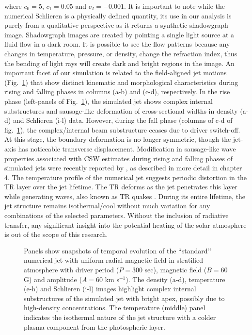 where $c_0=5$, $c_1=0.05$ and $c_2=-0.001$. It is important to note while the numerical Schlieren is a physically defined quantity, its use in our analysis is purely from a qualitative perspective as it returns a synthetic shadowgraph image. Shadowgraph images are created by pointing a single light source at a fluid flow in a dark room. It is possible to see the flow patterns because any changes in temperature, pressure, or density, change the refraction index, thus the bending of light rays will create dark and bright regions in the image. An important facet of our simulation is related to the field-aligned jet motions (Fig.~\ref{standard_jet}) that show distinct kinematic and morphological characteristics during rising and falling phases in columns (a-b) and (c-d), respectively. In the rise phase (left-panels of Fig.~\ref{standard_jet}), the simulated jet shows complex internal substructures and sausage-like deformation of cross-sectional widths in density (a-d) and Schlieren (i-l) data. However, during the fall phase (columns of c-d of fig.~\ref{standard_jet}), the complex/internal beam substructure ceases due to driver switch-off. At this stage, the boundary deformation is no longer symmetric, though the jet-axis has noticeable transverse displacement. Modification in sausage-like wave properties associated with CSW estimates during rising and falling phases of simulated jets were recently reported by \cite{Dover2020ApJ90572D}, as described in more detail in chapter 4. The temperature profile of the numerical jet suggests periodic distortion in the TR layer over the jet lifetime. The TR deforms as the jet penetrates this layer while generating waves, also known as TR quakes \citep{Scullion2011}. During its entire lifetime, the jet structure remains isothermal/cool without much variation for any combinations of the selected parameters. Without the inclusion of radiative transfer, any significant insight into the potential heating of the solar atmosphere is out of the scope of this research. \np
\begin{figure}
\captionsetup[subfigure]{labelformat=empty}
\centering
{}
\caption{Panels show snapshots of temporal evolution of the ``standard’’ numerical jet with uniform radial magnetic field in stratified atmosphere with driver period ($P = 300$ sec), magnetic field ($B = 60$ G) and amplitude ($A = 60$ km s$^{-1}$). The density (a-d), temperature (e-h) and Schlieren (i-l) images highlight complex internal substructures of the simulated jet with bright apex, possibly due to high-density concentrations. The temperature (middle) panel indicates the isothermal nature of the jet structure with a colder plasma component from the photospheric layer.}
\label{standard_jet}
\end{figure}
